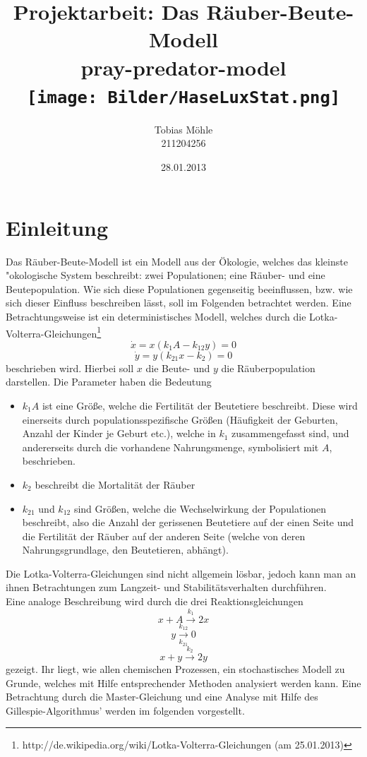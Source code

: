 \documentclass[11pt]{article}
\begin{document}
\begin{titlepage}
\title{Projektarbeit: Das Räuber-Beute-Modell \\ \small{pray-predator-model}\\ \texttt{[image: Bilder/HaseLuxStat.png]}}
\author{Tobias Möhle \\ 211204256}
\date{28.01.2013}
\maketitle
\end{titlepage}

\section{Einleitung}
Das Räuber-Beute-Modell ist ein Modell aus der Ökologie, welches das kleinste "okologische System beschreibt: zwei Populationen; eine Räuber- und eine Beutepopulation. Wie sich diese Populationen gegenseitig beeinflussen, bzw. wie sich dieser Einfluss beschreiben lässt, soll im Folgenden betrachtet werden.
Eine Betrachtungsweise ist ein deterministisches Modell, welches durch die Lotka-Volterra-Gleichungen\footnote{http://de.wikipedia.org/wiki/Lotka-Volterra-Gleichungen (am 25.01.2013)}
$$\dot x=x(k_1 A-k_{12}y)=0$$
$$\dot y=y(k_{21}x-k_2)=0$$
beschrieben wird.
Hierbei soll $x$ die Beute- und $y$ die Räuberpopulation darstellen. Die Parameter haben die Bedeutung
\begin{itemize}
   \item $k_1 A$ ist eine Größe, welche die Fertilität der Beutetiere beschreibt. Diese wird einerseits durch populationsspezifische Größen (Häufigkeit der Geburten, Anzahl der Kinder je Geburt etc.), welche in $k_1$ zusammengefasst sind, und andererseits durch die vorhandene Nahrungsmenge, symbolisiert mit $A$, beschrieben.
   \item $k_2$ beschreibt die Mortalität der Räuber
   \item $k_{21}$ und $k_{12}$ sind Größen, welche die Wechselwirkung der Populationen beschreibt, also die Anzahl der gerissenen Beutetiere auf der einen Seite und die Fertilität der Räuber auf der anderen Seite (welche von deren Nahrungsgrundlage, den Beutetieren, abhängt).
\end{itemize}

Die Lotka-Volterra-Gleichungen sind nicht allgemein lösbar, jedoch kann man an ihnen Betrachtungen zum Langzeit- und Stabilitätsverhalten durchführen.\\
Eine analoge Beschreibung wird durch die drei Reaktionsgleichungen 
$$x+A \xrightarrow{k_1} 2x $$
$$y \xrightarrow[k_{21}]{k_{12}} 0 $$
$$x+y \xrightarrow{k_2} 2y $$
gezeigt.
Ihr liegt, wie allen chemischen Prozessen, ein stochastisches Modell zu Grunde, welches mit Hilfe entsprechender Methoden analysiert werden kann. Eine Betrachtung durch die Master-Gleichung und eine Analyse mit Hilfe des Gillespie-Algorithmus' werden im folgenden vorgestellt.
\end{document}
